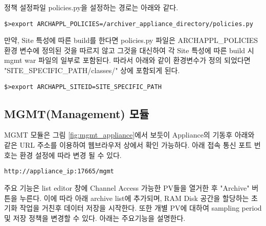\documentclass[11pt
  , a4paper
  , article
  , oneside
]{memoir}
\begin{document}
정책 설정파일 policies.py을 설정하는 경로는 아래와 같다.
\begin{lstlisting}[style=termstyle]
$>export ARCHAPPL_POLICIES=/archiver_appliance_directory/policies.py
\end{lstlisting}

만약, Site 특성에 따른 build를 한다면 policies.py 파일은 ARCHAPPL\_POLICIES 환경 변수에 정의된 것을 따르지 않고 그것을 대신하여 각 Site 특성에 따른 build 시 mgmt war 파일의 일부로 포함된다. 따라서 아래와 같이 환경변수가 정의 되었다면 "SITE\_SPECIFIC\_PATH/classes/" 상에 포함되게 된다.
\begin{lstlisting}[style=termstyle]
$>export ARCHAPPL_SITEID=SITE_SPECIFIC_PATH
\end{lstlisting}

\subsection*{MGMT(Management) 모듈}
MGMT 모듈은 그림 \ref{fig:mgmt_appliance}에서 보듯이 Appliance의 기동후 아래와 같은 URL 주소를 이용하여 웹브라우저 상에서 확인 가능하다. 아래 접속 통신 포트 번호는 환경 설정에 따라 변경 될 수 있다.
\begin{lstlisting}[style=termstyle]
http://appliance_ip:17665/mgmt
\end{lstlisting}
주요 기능은 list editor 창에 Channel Access 가능한 PV들을 열거한 후 "Archive" 버튼을 누른다. 이에 따라 아래 archive list에 추가되며, RAM Disk 공간을 할당하는 초기화 작업을 거친후 데이터 저장을 시작한다. 또한 개별 PV에 대하여 sampling period 및 저장 정책을 변경할 수 있다. 아래는 주요기능을 설명한다.
\end{document}
